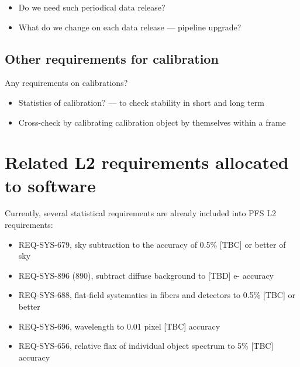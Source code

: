 \documentclass[a4paper,notitlepage]{article}
\begin{document}
\begin{itemize}
  \item Do we need such periodical data release?
  \item What do we change on each data release --- pipeline upgrade?
\end{itemize}


\subsection{Other requirements for calibration}

Any requirements on calibrations?

\begin{itemize}
  \item Statistics of calibration? --- to check stability in short and long 
    term
  \item Cross-check by calibrating calibration object by themselves within a 
    frame
\end{itemize}



\appendix

\section{Related L2 requirements allocated to software}

Currently, several statistical requirements are already included 
into PFS L2 requirements: 
\begin{itemize}
  \item REQ-SYS-679, sky subtraction to the accuracy of 0.5\% [TBC] or better 
    of sky
  \item REQ-SYS-896 (890), subtract diffuse background to [TBD] e- accuracy
  \item REQ-SYS-688, flat-field systematics in fibers and detectors to 0.5\% 
    [TBC] or better
  \item REQ-SYS-696, wavelength to 0.01 pixel [TBC] accuracy
  \item REQ-SYS-656, relative flax of individual object spectrum to 5\% [TBC]
    accuracy
\end{itemize}
\end{document}
